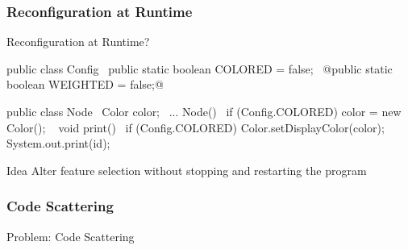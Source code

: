 \subsubsection{Reconfiguration at Runtime}
\begin{frame}[fragile]{Reconfiguration at Runtime?}
	\begin{mycolumns}[widths={45}]
		\small
\begin{codetight}{}
public class Config {
	~public static boolean COLORED = false;~
	@public static boolean WEIGHTED = false;@
}

\end{codetight}
\begin{codetight}{}
public class Node {
	~Color color;~
	...
	Node(){
		~if (Config.COLORED) {
			color = new Color();
		}~
	}
	void print() {
		~if (Config.COLORED) {
			Color.setDisplayColor(color);
		}~
		System.out.print(id);
	}
}
\end{codetight}
	\mynextcolumn
		\begin{definition}{Idea}
			Alter feature selection without stopping and restarting the program
		\end{definition}
	\end{mycolumns}
\end{frame}


\subsubsection{Code Scattering}
\begin{frame}{Problem: Code Scattering }
	\centering{}
\end{frame}

